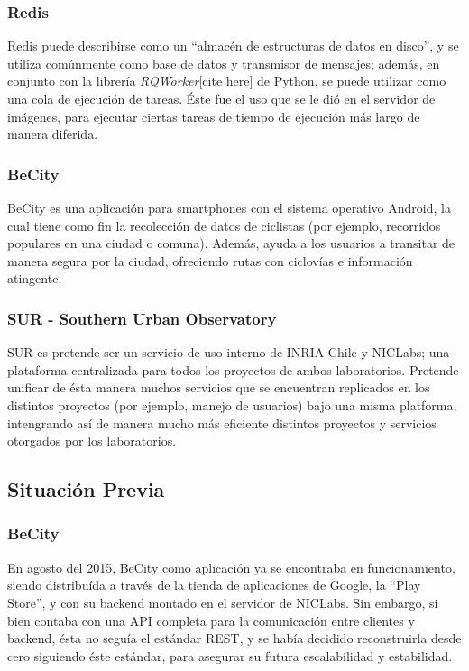 \documentclass[11pt,letterpaper]{article}
\begin{document}
\subsubsection{Redis}

Redis puede describirse como un ``almacén de estructuras de datos en disco'', y se utiliza comúnmente como base de datos y transmisor de mensajes; además, en conjunto con la librería \emph{RQWorker}[cite here] de Python, se puede utilizar como una cola de ejecución de tareas. Éste fue el uso que se le dió en el servidor de imágenes, para ejecutar ciertas tareas de tiempo de ejecución más largo de manera diferida.

\subsubsection{BeCity}

BeCity es una aplicación para smartphones con el sistema operativo Android, la cual tiene como fin la recolección de datos de ciclistas (por ejemplo, recorridos populares en una ciudad o comuna). Además, ayuda a los usuarios a transitar de manera segura por la ciudad, ofreciendo rutas con ciclovías e información atingente.

\subsubsection{SUR - Southern Urban Observatory}

SUR es pretende ser un servicio de uso interno de INRIA Chile y NICLabs; una plataforma centralizada para todos los proyectos de ambos laboratorios. Pretende unificar de ésta manera muchos servicios que se encuentran replicados en los distintos proyectos (por ejemplo, manejo de usuarios) bajo una misma platforma, intengrando así de manera mucho más eficiente distintos proyectos y servicios otorgados por los laboratorios.

\subsection{Situación Previa}
\subsubsection{BeCity}

En agosto del 2015, BeCity como aplicación ya se encontraba en funcionamiento, siendo distribuída a través de la tienda de aplicaciones de Google, la ``Play Store'', y con su backend montado en el servidor de NICLabs. Sin embargo, si bien contaba con una API completa para la comunicación entre clientes y backend, ésta no seguía el estándar REST, y se había decidido reconstruirla desde cero siguiendo éste estándar, para asegurar su futura escalabilidad y estabilidad.
\end{document}
